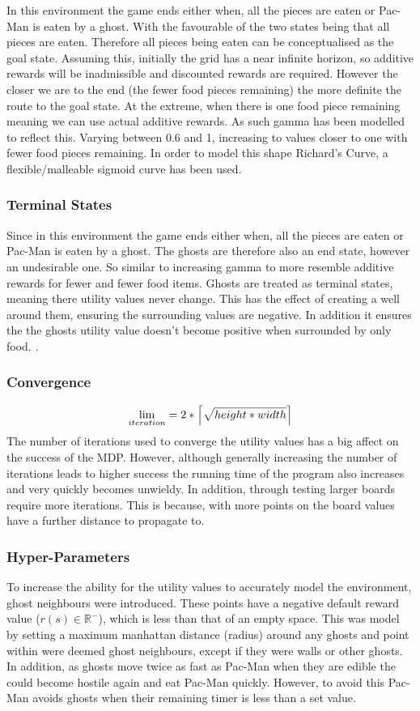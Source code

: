 \documentclass[letterpaper, 11pt, journal, final]{IEEEtran}
\DeclarePairedDelimiter\ceil{\lceil}{\rceil}
\begin{document}
In this environment the game ends either when, all the pieces are eaten or Pac-Man is eaten by a ghost. With the favourable of the two states being that all pieces are eaten. Therefore all pieces being eaten can be conceptualised as the goal state. Assuming this, initially the grid has a near infinite horizon\cite{russell2016artificial}, so additive rewards will be inadmissible and discounted rewards are required. However the closer we are to the end (the fewer food pieces remaining) the more definite the route to the goal state. At the extreme, when there is one food piece remaining meaning we can use actual additive rewards. As such gamma has been modelled to reflect this. Varying between 0.6 and 1, increasing to values closer to one with fewer food pieces remaining. In order to model this shape Richard's Curve\cite{richardsCurve}, a flexible/malleable sigmoid curve has been used.

\subsubsection{Terminal States}
Since in this environment the game ends either when, all the pieces are eaten or Pac-Man is eaten by a ghost. The ghosts are therefore also an end state, however an undesirable one. So similar to increasing gamma to more resemble additive rewards for fewer and fewer food items. Ghosts are treated as terminal states, meaning there utility values never change. This has the effect of creating a well around them, ensuring the surrounding values are negative. In addition it ensures the the ghosts utility value doesn't become positive when surrounded by only food. \cite{Bel}.


\subsubsection{Convergence}
\[\lim_{iteration} = 2 * \ceil*{\sqrt{height * width}}\]
The number of iterations used to converge the utility values has a big affect on the success of the MDP. However, although generally increasing the number of iterations leads to higher success the running time of the program also increases and very quickly becomes unwieldy. In addition, through testing larger boards require more iterations. This is because, with more points on the board values have a further distance to propagate to.

\subsubsection{Hyper-Parameters}
To increase the ability for the utility values to accurately model the environment, ghost neighbours were introduced. These points have a negative default reward value (\(r(s) \in \mathbb{R}^-\)), which is less than that of an empty space. This was model by setting a maximum manhattan distance (radius) around any ghosts and point within were deemed ghost neighbours, except if they were walls or other ghosts. In addition, as ghosts move twice as fast as Pac-Man when they are edible the could become hostile again and eat Pac-Man quickly. However, to avoid this Pac-Man avoids ghosts when their remaining timer is less than a set value.
\end{document}
